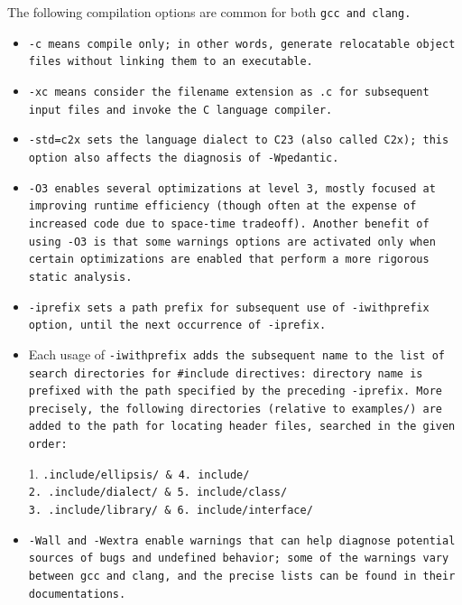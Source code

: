 The following compilation options are common for both \tt{gcc} and \tt{clang}.

\begin{itemize}

\item \tt{-c} means compile only; in other words, generate
relocatable object files without linking them to an executable.

\item \tt{-xc} means consider the filename extension as \tt{.c}
for subsequent input files and invoke the C language compiler.

\item \tt{-std=c2x} sets the language dialect to C23 (also called C2x);
this option also affects the diagnosis of \tt{-Wpedantic}.

\item \tt{-O3} enables several optimizations at
level 3, mostly focused at improving runtime efficiency
(though often at the expense of increased code due to space-time tradeoff).
Another benefit of using \tt{-O3} is that some warnings
options are activated only when certain optimizations are
enabled that perform a more rigorous static analysis.

\item \tt{-iprefix} sets a path prefix for subsequent use of
\tt{-iwithprefix} option, until the next occurrence of \tt{-iprefix}.

\item Each usage of \tt{-iwithprefix} adds the subsequent name to the
list of search directories for \tt{#include} directives: directory name
is prefixed with the path specified by the preceding \tt{-iprefix}.
More precisely, the following directories (relative to \tt{examples/}) are
added to the path for locating header files, searched in the given order:

\enlargethispage*{\baselineskip}


1. \tt{.include/ellipsis/} & 4. \tt{include/}\\

2. \tt{.include/dialect/}  & 5. \tt{include/class/}\\

3. \tt{.include/library/}  & 6. \tt{include/interface/}\\

\elbat

\item \tt{-Wall} and \tt{-Wextra} enable warnings that can help
diagnose potential sources of bugs and undefined behavior;
some of the warnings vary between \tt{gcc} and \tt{clang},
and the precise lists can be found in their documentations.


\end{itemize}
